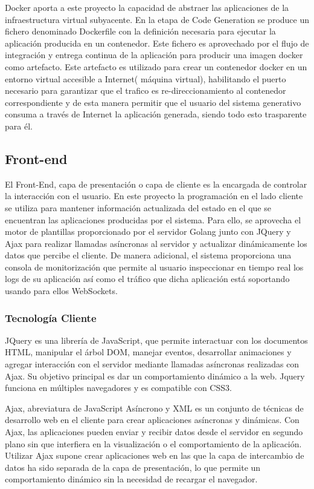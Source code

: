 \documentclass[a4paper,11pt]{book}
\begin{document}
Docker aporta a este proyecto la capacidad de abstraer las aplicaciones de la infraestructura virtual subyacente. En la etapa de Code Generation se produce un fichero denominado Dockerfile con la definición necesaria para ejecutar la aplicación producida en un contenedor. Este fichero es aprovechado  por el flujo de integración y entrega continua de la aplicación  para producir una imagen docker como artefacto. Este artefacto es utilizado para crear un contenedor docker en un entorno virtual accesible a Internet( máquina virtual), habilitando el puerto necesario para garantizar que el trafico es re-direccionamiento al contenedor correspondiente y de esta manera permitir que el usuario del sistema generativo consuma a través de Internet la aplicación generada, siendo todo esto trasparente para él. 


\subsection{Front-end}

El Front-End, capa de presentación o capa de cliente es la encargada de controlar la interacción con el usuario. En este proyecto la programación en el lado cliente se utiliza para mantener  información actualizada del estado en el que se encuentran las aplicaciones producidas por el sistema. Para ello, se aprovecha el motor de plantillas proporcionado por el servidor Golang junto con JQuery y Ajax para realizar llamadas asíncronas al servidor y actualizar dinámicamente los datos que percibe el cliente. De manera adicional, el sistema proporciona una consola de monitorización  que permite al usuario inspeccionar en tiempo real los logs de su aplicación así como el tráfico que dicha aplicación está soportando usando para ellos WebSockets. 

\subsubsection{Tecnología Cliente}


JQuery\cite{jq} es una librería de JavaScript, que permite interactuar con los documentos HTML, manipular el árbol DOM, manejar eventos, desarrollar animaciones y agregar interacción con el servidor mediante llamadas asíncronas realizadas con Ajax. Su objetivo principal es dar un comportamiento dinámico a la web. Jquery funciona en múltiples navegadores y es compatible con CSS3.

Ajax\cite{aj}, abreviatura de JavaScript Asíncrono y XML es un conjunto de técnicas de desarrollo web en el cliente para crear aplicaciones asíncronas y dinámicas. Con Ajax, las aplicaciones pueden enviar y recibir datos desde el servidor en segundo plano sin que interfiera en la visualización o el comportamiento de la aplicación. Utilizar Ajax supone crear aplicaciones web en las que la capa de intercambio de datos ha sido separada de la capa de presentación, lo que permite un comportamiento dinámico sin la necesidad de recargar el navegador.
\end{document}
